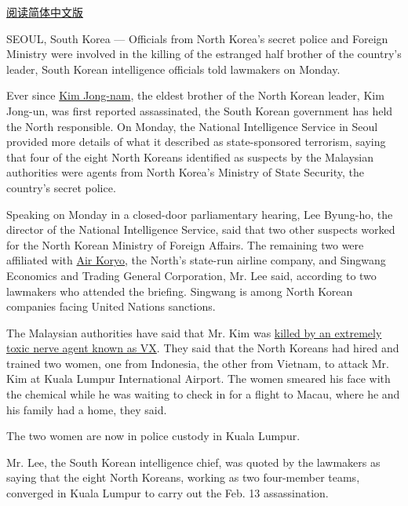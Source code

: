 \href{http://cn.nytimes3xbfgragh.onion/asia-pacific/20170228/north-korea-kim-jong-nam-state-security/}{阅读简体中文版}

SEOUL, South Korea --- Officials from North Korea's secret police and
Foreign Ministry were involved in the killing of the estranged half
brother of the country's leader, South Korean intelligence officials
told lawmakers on Monday.

Ever since
\href{https://www.nytimes3xbfgragh.onion/2017/02/14/world/asia/kim-jong-un-brother-killed-malaysia.html?action=click\&contentCollection=Asia\%20Pacific\&module=RelatedCoverage\&region=Marginalia\&pgtype=article}{Kim
Jong-nam}, the eldest brother of the North Korean leader, Kim Jong-un,
was first reported assassinated, the South Korean government has held
the North responsible. On Monday, the National Intelligence Service in
Seoul provided more details of what it described as state-sponsored
terrorism, saying that four of the eight North Koreans identified as
suspects by the Malaysian authorities were agents from North Korea's
Ministry of State Security, the country's secret police.

Speaking on Monday in a closed-door parliamentary hearing, Lee Byung-ho,
the director of the National Intelligence Service, said that two other
suspects worked for the North Korean Ministry of Foreign Affairs. The
remaining two were affiliated with
\href{http://www.airkoryo.com.kp/}{Air Koryo}, the North's state-run
airline company, and Singwang Economics and Trading General Corporation,
Mr. Lee said, according to two lawmakers who attended the briefing.
Singwang is among North Korean companies facing United Nations
sanctions.

The Malaysian authorities have said that Mr. Kim was
\href{https://www.nytimes3xbfgragh.onion/2017/02/23/world/asia/kim-jong-nam-vx-nerve-agent-.html?action=click\&contentCollection=Asia\%20Pacific\&module=RelatedCoverage\&region=Marginalia\&pgtype=article}{killed
by an extremely toxic nerve agent known as VX}. They said that the North
Koreans had hired and trained two women, one from Indonesia, the other
from Vietnam, to attack Mr. Kim at Kuala Lumpur International Airport.
The women smeared his face with the chemical while he was waiting to
check in for a flight to Macau, where he and his family had a home, they
said.

The two women are now in police custody in Kuala Lumpur.

Mr. Lee, the South Korean intelligence chief, was quoted by the
lawmakers as saying that the eight North Koreans, working as two
four-member teams, converged in Kuala Lumpur to carry out the Feb. 13
assassination.

